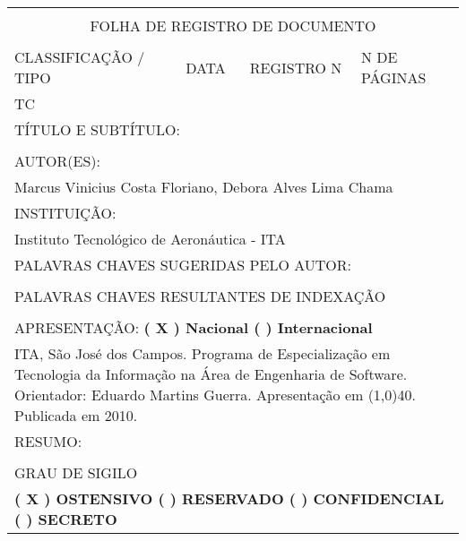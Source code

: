 \begin{titlepage}
\begin{table}
	\begin{tabular}{ | p{3.5cm} | p{3.5cm} | p{3.5cm} | p{3.5cm} |}
		\hline
		\multicolumn{4}{|l|}{ }\\
		\multicolumn{4}{|c|}{FOLHA DE REGISTRO DE DOCUMENTO}\\
		\multicolumn{4}{|l|}{ }\\
		\hline
		\scriptsize CLASSIFICAÇÃO / TIPO & \scriptsize DATA & \scriptsize REGISTRO N & \scriptsize N DE PÁGINAS\\[0.2cm]
		\centering \normalsize  TC &  &  &  \\[0.1cm]
		\hline
		\multicolumn{4}{|l|}{ \scriptsize TÍTULO E SUBTÍTULO: }\\[0.2cm]
		\multicolumn{4}{|l|}{ \tcctitle }\\[0.1cm]
		\hline
		\multicolumn{4}{|l|}{\scriptsize AUTOR(ES):}\\[0.2cm]
		\multicolumn{4}{|l|}{ Marcus Vinicius Costa Floriano, Debora Alves Lima Chama }\\[0.1cm]
		\hline
		\multicolumn{4}{|l|}{\scriptsize INSTITUIÇÃO:}\\[0.2cm]
		\multicolumn{4}{|l|}{ Instituto Tecnológico de Aeronáutica - ITA}\\[0.1cm]
		\hline
		\multicolumn{4}{|l|}{\scriptsize PALAVRAS CHAVES SUGERIDAS PELO AUTOR:}\\[0.2cm]
		\multicolumn{4}{|l|}{ }\\[0.1cm]
		\hline
		\multicolumn{4}{|l|}{\scriptsize PALAVRAS CHAVES RESULTANTES DE INDEXAÇÃO}\\[0.2cm]
		\multicolumn{4}{|l|}{ }\\[0.1cm]
		\hline
		\multicolumn{4}{|l|}{\scriptsize APRESENTAÇÃO: \normalsize \bfseries \hspace{2cm} ( X ) Nacional \hspace{2cm} (  ) Internacional }\\[0.2cm]
		\multicolumn{4}{|p{15.5cm}|}{ \small ITA, São José dos Campos. Programa de Especialização em Tecnologia da Informação na Área de Engenharia de Software. Orientador: Eduardo Martins Guerra. Apresentação em \line(1,0){40}. Publicada em 2010. }\\[0.2cm]
		\hline
		\multicolumn{4}{|l|}{\scriptsize RESUMO:}\\[3cm]
		\multicolumn{4}{|l|}{ }\\[0.1cm]
		\hline
		\multicolumn{4}{|l|}{\scriptsize GRAU DE SIGILO}\\[0.5cm]
		\multicolumn{4}{|l|}{\small \bfseries ( X ) OSTENSIVO \hspace{1cm} (  ) RESERVADO \hspace{1cm} (  ) CONFIDENCIAL \hspace{1cm} (  ) SECRETO}\\[0.5cm]
		\hline
	\end{tabular}
\end{table}
\end{titlepage}